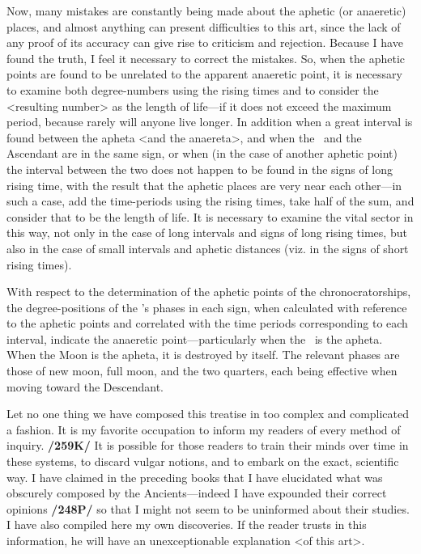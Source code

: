 Now, many mistakes are constantly being made about the aphetic (or anaeretic) places, and almost anything can present difficulties to this art, since the lack of any proof of its accuracy can give rise to criticism and rejection. Because I have found the truth, I feel it necessary to correct the mistakes. So, when the aphetic points are found to be unrelated to the apparent anaeretic point, it is necessary to examine
both degree-numbers using the rising times and to consider the <resulting number> as the length of life—if it does not exceed the maximum period, because rarely will anyone live longer. In addition when a great interval is found between the apheta <and the anaereta>, and when the \Moon\, and the Ascendant are in the
same sign, or when (in the case of another aphetic point) the interval between the two does not happen to be found in the signs of long rising time, with the result that the aphetic places are very near each other—in such a case, add the time-periods using the rising times, take half of the sum, and consider that to be the length of life. It is necessary to examine the vital sector in this way, not only in the case of long intervals and signs of long rising times, but also in the case of small intervals and aphetic distances (viz. in the signs of short rising times).

With respect to the determination of the aphetic points of the chronocratorships, the degree-positions of the \Moon’s phases in each sign, when calculated with reference to the aphetic points and correlated with the time periods corresponding to each interval, indicate the anaeretic point—particularly when the \Moon\, is the apheta. When the Moon is the apheta, it is destroyed by itself. The relevant phases are those of new moon, full moon, and the two quarters, each being effective when moving toward the Descendant.

Let no one thing we have composed this treatise in too complex and complicated a fashion. It is my favorite occupation to inform my readers of every method of inquiry. \textbf{/259K/} It is possible for those readers to train their minds over time in these systems, to discard vulgar notions, and to embark on the exact, scientific way. I have claimed in the preceding books that I have elucidated what was obscurely composed by the Ancients—indeed I have expounded their correct opinions \textbf{/248P/} so that I might not seem to be
uninformed about their studies. I have also compiled here my own discoveries. If the reader trusts in this information, he will have an unexceptionable explanation <of this art>. 

